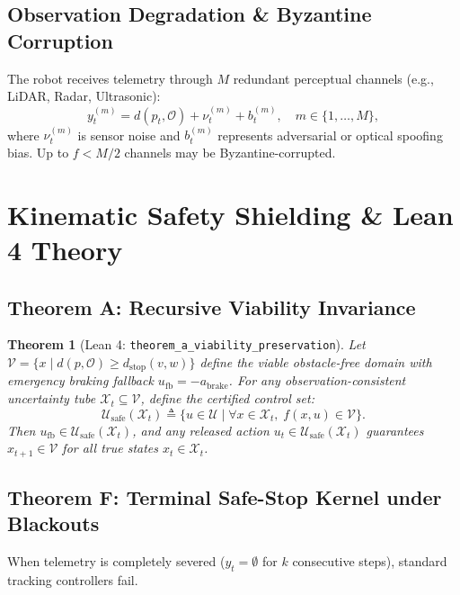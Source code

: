\documentclass[conference]{IEEEtran}
\newtheorem{theorem}{Theorem}
\begin{document}
\subsection{Observation Degradation \& Byzantine Corruption}
The robot receives telemetry through $M$ redundant perceptual channels (e.g., LiDAR, Radar, Ultrasonic):
\begin{equation}
y_t^{(m)} = d(p_t, \mathcal{O}) + \nu_t^{(m)} + b_t^{(m)}, \quad m \in \{1, \dots, M\},
\end{equation}
where $\nu_t^{(m)}$ is sensor noise and $b_t^{(m)}$ represents adversarial or optical spoofing bias. Up to $f < M/2$ channels may be Byzantine-corrupted.

\section{Kinematic Safety Shielding \& Lean 4 Theory}

\subsection{Theorem A: Recursive Viability Invariance}
\begin{theorem}[Lean 4: \texttt{theorem\_a\_\allowbreak viability\_\allowbreak preservation}]
Let $\mathcal{V} = \{ x \mid d(p, \mathcal{O}) \ge d_{\mathrm{stop}}(v, w) \}$ define the viable obstacle-free domain with emergency braking fallback $u_{\mathrm{fb}} = -a_{\mathrm{brake}}$. For any observation-consistent uncertainty tube $\mathcal{X}_t \subseteq \mathcal{V}$, define the certified control set:
\begin{equation}
\mathcal{U}_{\mathrm{safe}}(\mathcal{X}_t) \triangleq \{ u \in \mathcal{U} \mid \forall x \in \mathcal{X}_t, \; f(x, u) \in \mathcal{V} \}.
\end{equation}
Then $u_{\mathrm{fb}} \in \mathcal{U}_{\mathrm{safe}}(\mathcal{X}_t)$, and any released action $u_t \in \mathcal{U}_{\mathrm{safe}}(\mathcal{X}_t)$ guarantees $x_{t+1} \in \mathcal{V}$ for all true states $x_t \in \mathcal{X}_t$.
\end{theorem}

\subsection{Theorem F: Terminal Safe-Stop Kernel under Blackouts}
When telemetry is completely severed ($y_t = \emptyset$ for $k$ consecutive steps), standard tracking controllers fail.
\end{document}
